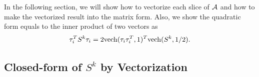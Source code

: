 \documentclass{article}
\theoremstyle{remark}
\begin{document}

In the following section, we will show how to vectorize each slice of $\cal A$ and  how to make the vectorized result into the matrix form. Also, we show the quadratic form equals to the inner product of two vectors as
\[
\tau_i^T S^{k}\tau_i  = 2{\rm vech}(\tau_i\tau_i^T,1)^T {\rm vech}(S^k,1/2).
\]

\subsection{Closed-form of $S^k$ by Vectorization}
\end{document}
